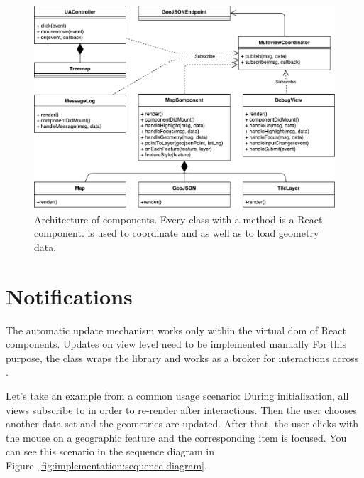\begin{figure}[ht]
  \centering
  \includegraphics[width=\textwidth]{figures/implementation/Architecture.pdf}
  \caption{%
    Architecture of components.
    Every class with a  method is a React component.
     is used to coordinate \tmap{} and \gv{} as well as to load geometry data.
  }\label{fig:implementation:architecture}
\end{figure}

\section{Notifications}

The automatic update mechanism works only within the virtual \gls{dom} of React components.
Updates on view level need to be implemented manually
For this purpose, the class  wraps the library  and works as a broker for interactions across \cmvs{}.

Let's take an example from a common usage scenario:
During initialization, all views subscribe to  in order to re-render after interactions.
Then the user chooses another data set and the geometries are updated.
After that, the user clicks with the mouse on a geographic feature and the corresponding item is focused.
You can see this scenario in the sequence diagram in Figure~\ref{fig:implementation:sequence-diagram}.

